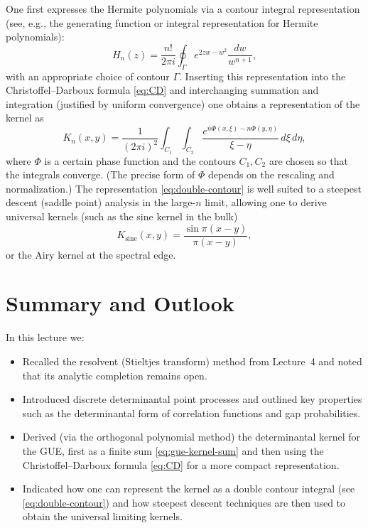 \documentclass[letterpaper,11pt,oneside,reqno]{article}
\numberwithin{equation}{section}
\theoremstyle{definition}
\begin{document}
One first expresses the Hermite polynomials via a contour integral representation (see, e.g., the generating function or integral representation for Hermite polynomials):
\[
H_n(z)=\frac{n!}{2\pi i}\oint_\Gamma e^{2zw-w^2}\frac{dw}{w^{n+1}},
\]
with an appropriate choice of contour $\Gamma$. Inserting this representation into the Christoffel--Darboux formula \eqref{eq:CD} and interchanging summation and integration (justified by uniform convergence) one obtains a representation of the kernel as
\begin{equation}
\label{eq:double-contour}
K_n(x,y)=\frac{1}{(2\pi i)^2}\int_{C_1}\int_{C_2} \frac{e^{n\Phi(x,\xi)-n\Phi(y,\eta)}}{\xi-\eta}\,d\xi\,d\eta,
\end{equation}
where $\Phi$ is a certain phase function and the contours $C_1,C_2$ are chosen so that the integrals converge. (The precise form of $\Phi$ depends on the rescaling and normalization.) The representation \eqref{eq:double-contour} is well suited to a steepest descent (saddle point) analysis in the large-$n$ limit, allowing one to derive universal kernels (such as the sine kernel in the bulk)
\[
K_{\mathrm{sine}}(x,y)=\frac{\sin\pi(x-y)}{\pi(x-y)},
\]
or the Airy kernel at the spectral edge.

\section{Summary and Outlook}
In this lecture we:
\begin{itemize}
  \item Recalled the resolvent (Stieltjes transform) method from Lecture~4 and noted that its analytic completion remains open.
  \item Introduced discrete determinantal point processes and outlined key properties such as the determinantal form of correlation functions and gap probabilities.
  \item Derived (via the orthogonal polynomial method) the determinantal kernel for the GUE, first as a finite sum \eqref{eq:gue-kernel-sum} and then using the Christoffel--Darboux formula \eqref{eq:CD} for a more compact representation.
  \item Indicated how one can represent the kernel as a double contour integral (see \eqref{eq:double-contour}) and how steepest descent techniques are then used to obtain the universal limiting kernels.
\end{itemize}
\end{document}
